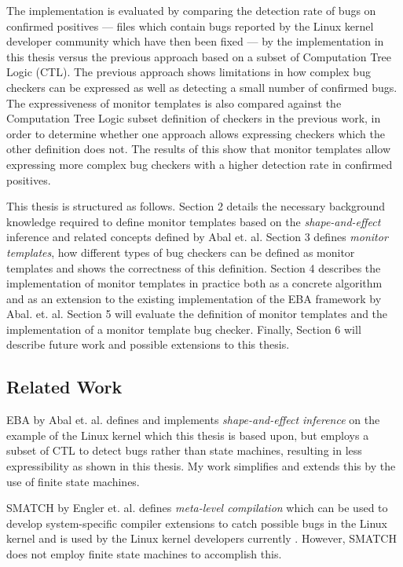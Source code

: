 \newpar The implementation is evaluated by comparing the detection rate of bugs on confirmed positives --- files which contain bugs reported by the Linux kernel developer community which have then been fixed --- by the implementation in this thesis versus the previous approach based on a subset of Computation Tree Logic (CTL). The previous approach shows limitations in how complex bug checkers can be expressed as well as detecting a small number of confirmed bugs. The expressiveness of monitor templates is also compared against the Computation Tree Logic subset definition of checkers in the previous work, in order to determine whether one approach allows expressing checkers which the other definition does not. The results of this show that monitor templates allow expressing more complex bug checkers with a higher detection rate in confirmed positives.   

\newpar This thesis is structured as follows. Section 2 details the necessary background knowledge required to define monitor templates based on the \textit{shape-and-effect} inference and related concepts defined by Abal et. al. Section 3 defines \textit{monitor templates}, how different types of bug checkers can be defined as monitor templates and shows the correctness of this definition. Section 4 describes the implementation of monitor templates in practice both as a concrete algorithm and as an extension to the existing implementation of the EBA framework by Abal. et. al. Section 5 will evaluate the definition of monitor templates and the implementation of a monitor template bug checker. Finally, Section 6 will describe future work and possible extensions to this thesis.    

\subsection{Related Work}
EBA by Abal et. al. defines and implements \textit{shape-and-effect inference} on the example of the Linux kernel \cite{Abal2017EffectiveBF} which this thesis is based upon, but employs a subset of CTL to detect bugs rather than state machines, resulting in less expressibility as shown in this thesis. My work simplifies and extends this by the use of finite state machines. 

\newpar SMATCH by Engler et. al. defines \textit{meta-level compilation} which can be used to develop system-specific compiler extensions to catch possible bugs in the Linux kernel and is used by the Linux kernel developers currently \cite{smatch}. However, SMATCH does not employ finite state machines to accomplish this. 

